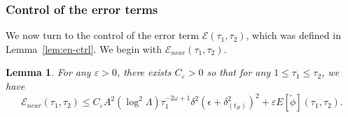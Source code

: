 \documentclass[10pt, reqno]{amsart}
\newtheorem{lemma}[theorem]{Lemma}
\theoremstyle{definition}
\theoremstyle{remark}
\theoremstyle{conjecture}
\numberwithin{equation}{section}
\newcommand{\abs}[1]{\vert#1\vert}
\newcommand{\set}[1]{\{#1\}}
\newcommand{\ud}{\mathrm{d}}
\newcommand{\rd}{\partial}
\newcommand{\0}{\emptyset}
\newcommand{\dlt}{\delta}
\newcommand{\eps}{\epsilon}
\newcommand{\veps}{\varepsilon}
\newcommand{\lmb}{\lambda}
\newcommand{\Lmb}{\Lambda}
\newcommand{\omg}{\omega}
\newcommand{\calD}{\mathcal D}
\newcommand{\calE}{\mathcal E}
\newcommand{\dur}{\nu}
\newcommand{\dvr}{\lmb}
\newcommand{\phibg}{\overline{\phi}}				%
\newcommand{\dvrbg}{\overline{\dvr}}				%
\newcommand{\durbg}{\overline{\dur}}				%
\newcommand{\rbg}{\overline{r}}					%
\newcommand{\phidf}{\widetilde{\phi}}				%
\newcommand{\Abs}[1]{\left\vert #1 \right\vert}
\begin{document}
\subsubsection*{Control of the error terms}
We now turn to the control of the error term $\calE(\tau_{1}, \tau_{2})$, which was defined in Lemma~\ref{lem:en-ctrl}.
We begin with $\calE_{near}(\tau_{1}, \tau_{2})$.
\begin{lemma} \label{lem:en-err-near}
For any $\veps > 0$, there exists $C_{\veps} > 0$ so that for any $1 \leq \tau_{1} \leq \tau_{2}$, we have
\begin{equation} \label{eq:en-err-near}
	\calE_{near}(\tau_{1}, \tau_{2}) \leq C_{\veps} A^{2} (\log^{2} \Lmb) \tau_{1}^{-2 \omg + 1} \dlt^{2} \left( \eps + \dlt_{(t_{B})}^{2} \right)^{2} + \veps E[\phidf](\tau_{1}, \tau_{2}).
\end{equation}
\end{lemma}
\end{document}
